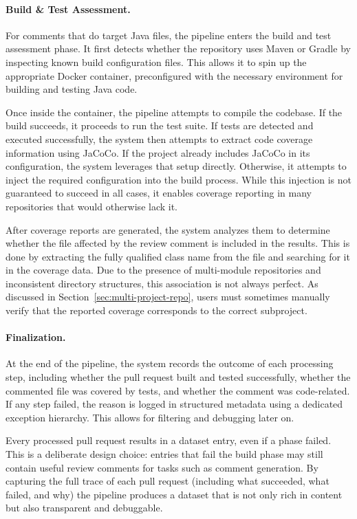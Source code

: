 \paragraph{Build \& Test Assessment.} For comments that do target Java files, the pipeline enters
the build and test assessment phase. It first detects whether the repository uses Maven or Gradle by
inspecting known build configuration files. This allows it to spin up the appropriate Docker
container, preconfigured with the necessary environment for building and testing Java code.

Once inside the container, the pipeline attempts to compile the codebase. If the build succeeds, it
proceeds to run the test suite. If tests are detected and executed successfully, the system then
attempts to extract code coverage information using JaCoCo. If the project already includes JaCoCo
in its configuration, the system leverages that setup directly. Otherwise, it attempts to inject the
required configuration into the build process. While this injection is not guaranteed to succeed in
all cases, it enables coverage reporting in many repositories that would otherwise lack it.

After coverage reports are generated, the system analyzes them to determine whether the file
affected by the review comment is included in the results. This is done by extracting the fully
qualified class name from the file and searching for it in the coverage data. Due to the presence of
multi-module repositories and inconsistent directory structures, this association is not always
perfect. As discussed in Section~\ref{sec:multi-project-repo}, users must sometimes manually verify
that the reported coverage corresponds to the correct subproject.

\paragraph{Finalization.} At the end of the pipeline, the system records the outcome of each
processing step, including whether the pull request built and tested successfully, whether the
commented file was covered by tests, and whether the comment was code-related. If any step failed,
the reason is logged in structured metadata using a dedicated exception hierarchy. This allows for
filtering and debugging later on.

Every processed pull request results in a dataset entry, even if a phase failed. This is a
deliberate design choice: entries that fail the build phase may still contain useful review comments
for tasks such as comment generation. By capturing the full trace of each pull request (including
what succeeded, what failed, and why) the pipeline produces a dataset that is not only rich in
content but also transparent and debuggable.

